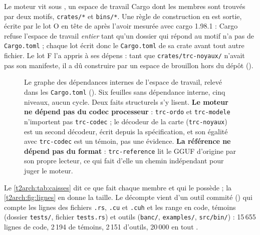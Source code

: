 Le moteur vit sous , un espace de travail Cargo dont les membres sont trouvés par deux motifs, \texttt{crates/*} et \texttt{bins/*}. Une règle de construction en est sortie, écrite par le lot O en tête de  après l'avoir mesurée avec cargo 1.98.1 : Cargo refuse l'espace de travail \emph{entier} tant qu'un dossier qui répond au motif n'a pas de \texttt{Cargo.toml} ; chaque lot écrit donc le \texttt{Cargo.toml} de sa crate avant tout autre fichier. Le lot F l'a appris à ses dépens : tant que \texttt{crates/trc-noyaux/} n'avait pas son manifeste, il a dû construire par un espace de brouillon hors du dépôt ().

\begin{figure}[p]
\centering
\TdArchCaisses
\caption[Le graphe des dépendances internes]{Le graphe des dépendances internes de l'espace de travail, relevé dans les \texttt{Cargo.toml} (). Six feuilles sans dépendance interne, cinq niveaux, aucun cycle. Deux faits structurels s'y lisent. \textbf{Le moteur ne dépend pas du codec processeur} : \texttt{trc-ordo} et \texttt{trc-modele} n'importent pas \texttt{trc-codec} ; le décodeur de la carte (\texttt{trc-noyaux}) est un second décodeur, écrit depuis la spécification, et son égalité avec \texttt{trc-codec} est un témoin, pas une évidence. \textbf{La référence ne dépend pas du format} : \texttt{trc-reference} lit le GGUF d'origine par son propre lecteur, ce qui fait d'elle un chemin indépendant pour juger le moteur.}
\label{t2arch:fig:caisses}
\end{figure}

Le \cref{t2arch:tab:caisses} dit ce que fait chaque membre et qui le possède ; la \cref{t2arch:fig:lignes} en donne la taille. Le décompte vient d'un outil commité () qui compte les lignes des fichiers \texttt{.rs}, \texttt{.cu} et \texttt{.cuh} et les range en code, témoins (dossier \texttt{tests/}, fichier \texttt{tests.rs}) et outils (\texttt{banc/}, \texttt{examples/}, \texttt{src/bin/}) : 15\,655 lignes de code, 2\,194 de témoins, 2\,151 d'outils, 20\,000 en tout \calc.


